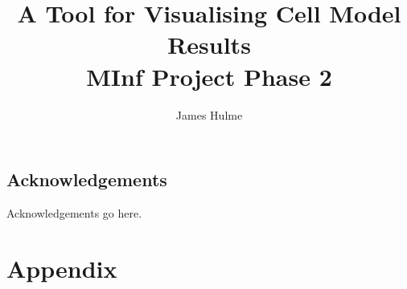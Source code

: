 \documentclass[bsc, frontabs, twoside, singlespacing, parskip]{infthesis}
\begin{document}
\title{A Tool for Visualising Cell Model Results \\
       MInf Project Phase 2}
\author{James Hulme}

\maketitle

\section*{Acknowledgements}
Acknowledgements go here.

\thispagestyle{empty}

\newpage


\thispagestyle{empty}

\newpage

\tableofcontents
\thispagestyle{empty}

\clearpage
\setcounter{page}{1}





%





\clearpage
\chapter{Appendix}

\end{document}
